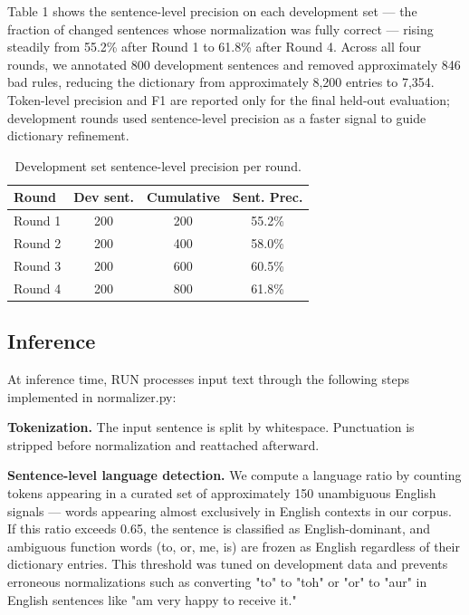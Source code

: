 \documentclass[11pt]{article}
\begin{document}
Table 1 shows the sentence-level precision on each development set — the fraction of changed sentences whose normalization was fully correct — rising steadily from 55.2\% after Round 1 to 61.8\% after Round 4. Across all four rounds, we annotated 800 development sentences and removed approximately 846 bad rules, reducing the dictionary from approximately 8,200 entries to 7,354. Token-level precision and F1 are reported only for the final held-out evaluation; development rounds used sentence-level precision as a faster signal to guide dictionary refinement.


\begin{table}[h]
\centering
\small
\begin{tabular}{lccc}
\toprule
\textbf{Round} & \textbf{Dev sent.} & \textbf{Cumulative} & \textbf{Sent. Prec.} \\
\midrule
Round 1 & 200 & 200  & 55.2\% \\
Round 2 & 200 & 400  & 58.0\% \\
Round 3 & 200 & 600  & 60.5\% \\
Round 4 & 200 & 800  & 61.8\% \\
\bottomrule
\end{tabular}
\caption{Development set sentence-level precision per round.}
\label{tab:dev-rounds}
\end{table}

\subsection{Inference}
At inference time, RUN processes input text through the following steps implemented in normalizer.py:

\textbf{Tokenization.} The input sentence is split by whitespace. Punctuation is stripped before normalization and reattached afterward.

\textbf{Sentence-level language detection.} We compute a language ratio by counting tokens appearing in a curated set of approximately 150 unambiguous English signals — words appearing almost exclusively in English contexts in our corpus. If this ratio exceeds 0.65, the sentence is classified as English-dominant, and ambiguous function words (to, or, me, is) are frozen as English regardless of their dictionary entries. This threshold was tuned on development data and prevents erroneous normalizations such as converting "to" to "toh" or "or" to "aur" in English sentences like "am very happy to receive it."
\end{document}
